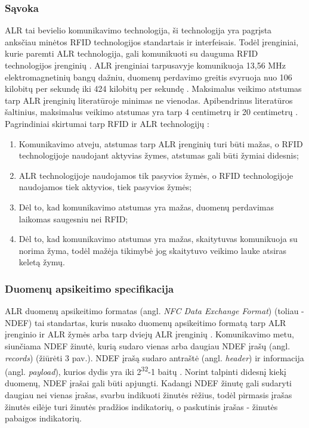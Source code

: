 \subsubsection{Sąvoka}
ALR tai bevielio komunikavimo technologija, ši technologija yra pagrįsta anksčiau minėtos RFID technologijos standartais ir interfeisais. Todėl įrenginiai, kurie paremti ALR technologija, gali komunikuoti su dauguma RFID technologijos įrenginių \cite{Motlagh2012}. ALR įrenginiai tarpusavyje komunikuoja 13,56 MHz elektromagnetinių bangų dažniu, duomenų perdavimo greitis svyruoja nuo 106 kilobitų per sekundę iki 424 kilobitų per sekundę \cite{whitepapaer}. Maksimalus veikimo atstumas tarp ALR įrenginių literatūroje minimas ne vienodas. Apibendrinus literatūros šaltinius, maksimalus veikimo atstumas yra tarp 4 centimetrų ir 20 centimetrų \cite{whitepapaer} \cite{Motlagh2012} \cite{Leora1980}. Pagrindiniai skirtumai tarp RFID ir ALR technologijų \cite{Leora1980}:
\begin{enumerate}
    \item Komunikavimo atveju, atstumas tarp ALR įrenginių turi būti mažas, o RFID technologijoje naudojant aktyvias žymes, atstumas gali būti žymiai didesnis;
    \item ALR technologijoje naudojamos tik pasyvios žymės, o RFID technologijoje naudojamos tiek aktyvios, tiek pasyvios žymės;
    \item Dėl to, kad komunikavimo atstumas yra mažas, duomenų perdavimas laikomas saugesniu nei RFID;
    \item Dėl to, kad komunikavimo atstumas yra mažas, skaitytuvas komunikuoja su norima žyma, todėl mažėja tikimybė jog skaitytuvo veikimo lauke atsiras keletą žymų.
\end{enumerate}
 

\subsubsection{Duomenų apsikeitimo specifikacija}
ALR duomenų apsikeitimo formatas (angl. \textit{NFC Data Exchange Format}) (toliau - NDEF) tai standartas, kuris nusako duomenų apsikeitimo formatą tarp ALR įrenginio ir ALR žymės arba tarp dviejų ALR įrenginių \cite{Leora1980}. Komunikavimo metu, siunčiama NDEF žinutė, kurią sudaro vienas arba daugiau NDEF įrašų (angl. \textit{records}) (žiūrėti 3 pav.). NDEF įrašą sudaro antraštė (angl. \textit{header}) ir informacija (angl. \textit{payload}), kurios dydis yra iki 2\textsuperscript{32}-1 baitų \cite{NFCForum2006}. Norint talpinti didesnį kiekį duomenų, NDEF įrašai gali būti apjungti. Kadangi NDEF žinutę gali sudaryti daugiau nei vienas įrašas, svarbu indikuoti žinutės rėžius, todėl pirmasis įrašas žinutės eilėje turi žinutės pradžios indikatorių, o paskutinis įrašas - žinutės pabaigos indikatorių.

